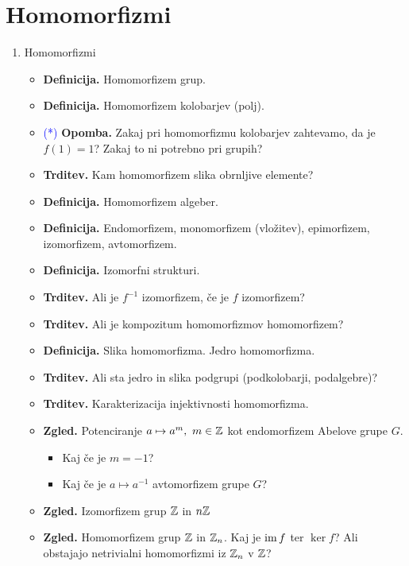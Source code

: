 \section{Homomorfizmi}

\begin{enumerate}
    \item Homomorfizmi
    \begin{itemize}
        \item \textbf{Definicija.} Homomorfizem grup.
        \item \textbf{Definicija.} Homomorfizem kolobarjev (polj).
        \item \textcolor{blue}{(*)} \textbf{Opomba.} Zakaj pri homomorfizmu kolobarjev zahtevamo, da je \(f(1) = 1\)? Zakaj to ni potrebno pri grupih? 
        \item \textbf{Trditev.} Kam homomorfizem slika obrnljive elemente?
        \item \textbf{Definicija.} Homomorfizem algeber.
        \item \textbf{Definicija.} Endomorfizem, monomorfizem (vložitev), epimorfizem, izomorfizem, avtomorfizem.
        \item \textbf{Definicija.} Izomorfni strukturi.
        \item \textbf{Trditev.} Ali je \(f^{-1}\) izomorfizem, če je \(f\) izomorfizem?
        \item \textbf{Trditev.} Ali je kompozitum homomorfizmov homomorfizem?
        \item \textbf{Definicija.} Slika homomorfizma. Jedro homomorfizma.
        \item \textbf{Trditev.} Ali sta jedro in slika podgrupi (podkolobarji, podalgebre)?
        \item \textbf{Trditev.} Karakterizacija injektivnosti homomorfizma.
        \item \textbf{Zgled.} Potenciranje \(a \mapsto a^m, \ m \in \mathbb{Z}\) kot endomorfizem Abelove grupe \(G\). 
        \begin{itemize}
            \item Kaj če je \(m = -1\)?
            \item Kaj če je \(a \mapsto a^{-1}\) avtomorfizem grupe \(G\)?
        \end{itemize}
        \item \textbf{Zgled.} Izomorfizem grup \(\mathbb{Z}\) in \(n\mathbb{Z}\)
        \item \textbf{Zgled.} Homomorfizem grup \(\mathbb{Z}\) in \(\mathbb{Z}_n\). Kaj je \(\operatorname{im} f\) ter \(\ker f\)? Ali obstajajo netrivialni homomorfizmi iz \(\mathbb{Z}_n\) v \(\mathbb{Z}\)?

\end{itemize}
\end{enumerate}
